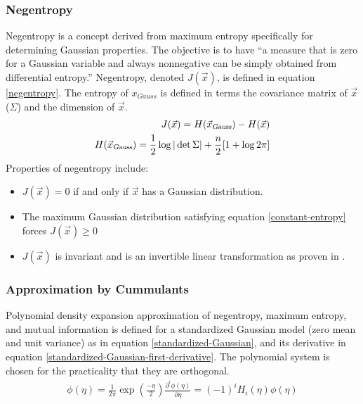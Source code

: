 \documentclass[11pt]{article}
\begin{document}
\subsubsection{Negentropy}\label{maximizing-via-negentropy}
Negentropy is a concept derived from maximum entropy specifically for determining Gaussian properties.  The objective is to have ``a measure that is zero for a Gaussian variable and always nonnegative can be simply obtained from differential entropy.''  Negentropy, denoted $J(\vec{x})$, is defined in equation \ref{negentropy}.  The entropy of $x_{Gauss}$ is defined in terms the covariance matrix of $\vec{x}$ ($\Sigma$) and the dimension of $\vec{x}$.
\begin{eqnarray}
J(\vec{x}) = H(\vec{x}_{\textsl{Gauss}}) - H(\vec{x}) \label{negentropyGauss}\\
H(\vec{x}_{\textsl{Gauss}}) = \frac{1}{2}\log |\det \Sigma | + \frac{n}{2}[1 + \log {2\pi}] \label{normalEntropy}
\end{eqnarray}
Properties of negentropy include:
\begin{itemize}
	\item $J(\vec{x}) = 0$ if and only if $\vec{x}$ has a Gaussian distribution.
	\item The maximum Gaussian distribution satisfying equation \ref{constant-entropy} forces $J(\vec{x}) \ge 0$
	\item $J(\vec{x})$ is invariant and is an invertible linear transformation as proven in \cite[113]{appo-ica-book}.
\end{itemize}



\subsubsection{Approximation by Cummulants}
Polynomial density expansion approximation of negentropy, maximum entropy, and mutual information is defined for a standardized Gaussian model (zero mean and unit variance) as in equation \ref{standardized-Gaussian}, and its derivative in equation \ref{standardized-Gaussian-first-derivative}.  The polynomial system is chosen for the practicality that they are orthogonal.  
\begin{eqnarray}
\phi (\eta) = \frac{1}{2\pi} \exp (\frac{-\eta}{2}) \label{standardized-Gaussian}
\frac{\partial ^i \phi (\eta)} {\partial \eta} = (-1)^i H_i(\eta)\phi (\eta) \label{standardized-Gaussian-first-derivative}
\end{eqnarray}
\end{document}
